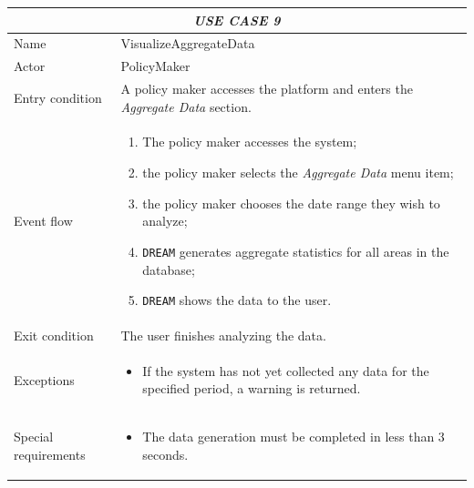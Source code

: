 \documentclass{article}
\begin{document}
\centering
\begin{tabular}{|p{3.5cm}|m{8cm}|}
 \hline
 \multicolumn{2}{|c|}{\emph{USE CASE 9}} \\
 \hline
 Name & VisualizeAggregateData\\
 \hline
 Actor & PolicyMaker\\
 \hline
 Entry condition & A policy maker accesses the platform and enters the \emph{Aggregate Data} section.\\
 \hline
 Event flow & \begin{enumerate}
    \item The policy maker accesses the system;
    \item the policy maker selects the \emph{Aggregate Data} menu item;
    \item the policy maker chooses the date range they wish to analyze;
    \item \verb|DREAM| generates aggregate statistics for all areas in the database;
    \item \verb|DREAM| shows the data to the user.
 \end{enumerate}\\
 \hline
 Exit condition & The user finishes analyzing the data.\\
 \hline
 Exceptions & \begin{itemize}
     \item If the system has not yet collected any data for the specified period, a warning is returned.
 \end{itemize}\\
 \hline
 Special requirements &\begin{itemize}
     \item The data generation must be completed in less than 3 seconds.
 \end{itemize}\\
 \hline
\end{tabular}
\end{document}
